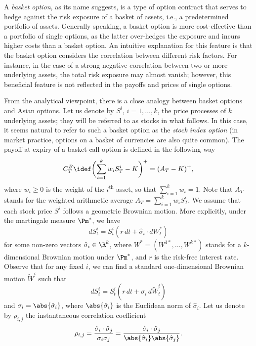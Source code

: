A \textit{basket option}, as its name suggests, is a type of option contract that serves to hedge against the risk exposure of a basket of assets, i.e., a predetermined portfolio of assets. Generally speaking, a basket option is more cost-effective than a portfolio of single options, as the latter over-hedges the exposure and incurs higher costs than a basket option. An intuitive explanation for this feature is that the basket option considers the correlation between different risk factors. For instance, in the case of a strong negative correlation between two or more underlying assets, the total risk exposure may almost vanish; however, this beneficial feature is not reflected in the payoffs and prices of single options.

From the analytical viewpoint, there is a close analogy between basket options and Asian options. Let us denote by $S^i$, $i=1,\dots,k$, the price processes of $k$ underlying assets; they will be referred to as stocks in what follows. In this case, it seems natural to refer to such a basket option as the \textit{stock index option} (in market practice, options on a basket of currencies are also quite common). The payoff at expiry of a basket call option is defined in the following way
\begin{equation} \label{eq:BasketCallPayoff}
	C_T^B \idef \biggl( \sum_{i=1}^k w_i S_T^i - K \biggr)^+ = (A_T - K)^+,
\end{equation}
where $w_i \ge 0$ is the weight of the $i^{\text{th}}$ asset, so that $\sum_{i=1}^k w_i = 1$. Note that $A_T$ stands for the weighted arithmetic average $A_T = \sum_{i=1}^k w_i S_T^i$. We assume that each stock price $S^i$ follows a geometric Brownian motion. More explicitly, under the martingale measure $\Pm^*$, we have
\begin{equation} \label{eq:StockDynamicsVector}
	dS_t^i = S_t^i (r \, dt + \hat{\sigma}_i \cdot dW_t^*)
\end{equation}
for some non-zero vectors $\hat{\sigma}_i \in \R^k$, where $W^* = (W^{1*}, \dots, W^{k*})$ stands for a $k$-dimensional Brownian motion under $\Pm^*$, and $r$ is the risk-free interest rate. Observe that for any fixed $i$, we can find a standard one-dimensional Brownian motion $\tilde{W}^i$ such that
\begin{equation} \label{eq:StockDynamicsScalar}
	dS_t^i = S_t^i (r \, dt + \sigma_i \, d\tilde{W}_t^i)
\end{equation}
and $\sigma_i = \abs{\hat{\sigma}_i}$, where $\abs{\hat{\sigma}_i}$ is the Euclidean norm of $\hat{\sigma}_i$. Let us denote by $\rho_{i,j}$ the instantaneous correlation coefficient
\[
	\rho_{i,j} = \frac{\hat{\sigma}_i \cdot \hat{\sigma}_j}{\sigma_i \sigma_j} = \frac{\hat{\sigma}_i \cdot \hat{\sigma}_j}{\abs{\hat{\sigma}_i} \abs{\hat{\sigma}_j}}.
\]

